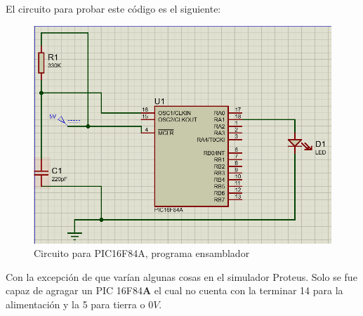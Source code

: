 \documentclass[conference]{IEEEtran}
\begin{document}
    El circuito para probar este código es el siguiente:

    \bigbreak

    \begin{figure}[H]
        \centering
        \includegraphics[width=0.3\paperwidth]{images/pic16f84a-assembly-sim.png}
        \caption{Circuito para PIC16F84A, programa ensamblador}
    \end{figure}

    \bigbreak

    Con la excepción de que varían algunas cosas en el simulador Proteus. Solo se fue capaz de agragar un PIC 16F84\textbf{A} el cual no cuenta con la terminar 14 para la alimentación y la 5 para tierra o $0V$.

    \bigbreak

    \printbibliography
\end{document}
